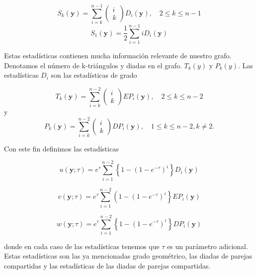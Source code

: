 \begin{equation*}
    S_{k}(\mathbf{y})=\sum_{i=k}^{n-1}\left(\begin{array}{l}i \\ k\end{array}\right) D_{i}(\mathbf{y}), \quad 2 \leq k \leq n-1 
\end{equation*}
\begin{equation*}
    S_{1}(\mathbf{y})=\frac{1}{2} \sum_{i=1}^{n-1} i D_{i}(\mathbf{y})
\end{equation*}

Estas estadísticas contienen mucha información relevante de nuestro grafo. Denotamos el número de k-triángulos y diadas en el grafo. $T_k(y)$ y $P_k(y)$. Las estadísticas $D_i$ son las estadísticas de grado

\begin{equation*}
    T_{k}(\mathbf{y})=\sum_{i=k}^{n-2}\left(\begin{array}{l}i \\ k\end{array}\right) E P_{i}(\mathbf{y}), \quad 2 \leq k \leq n-2
\end{equation*}
y
\begin{equation*}
    P_{k}(\mathbf{y})=\sum_{i=k}^{n-2}\left(\begin{array}{l}i \\ k\end{array}\right) D P_{i}(\mathbf{y}), \quad 1 \leq k \leq n-2, k \neq 2.
\end{equation*}

Con este fin definimos las estadísticas

\begin{equation*}
    u(\mathbf{y} ; \tau)=e^{\tau} \sum_{i=1}^{n-2}\left\{1-\left(1-e^{-\tau}\right)^{i}\right\} D_{i}(\mathbf{y})
\end{equation*}

\begin{equation*}
    v(\mathbf{y} ; \tau)=e^{\tau} \sum_{i=1}^{n-2}\left(1-\left(1-e^{-\tau}\right)^{i}\right\} E P_{i}(\boldsymbol{y})
\end{equation*}

\begin{equation}
    w(\mathbf{y} ; \tau)=e^{\tau} \sum_{i=1}^{n-2}\left\{1-\left(1-e^{-\tau}\right)^{i}\right\} D P_{i}(\mathbf{y})
\end{equation}

donde en cada caso de las estadísticas tenemos que $\tau$ es un parámetro adicional. Estas estadísticas son las ya mencionadas  grado geométrico, las diadas de parejas compartidas y las estadísticas de las diadas de parejas compartidas.

